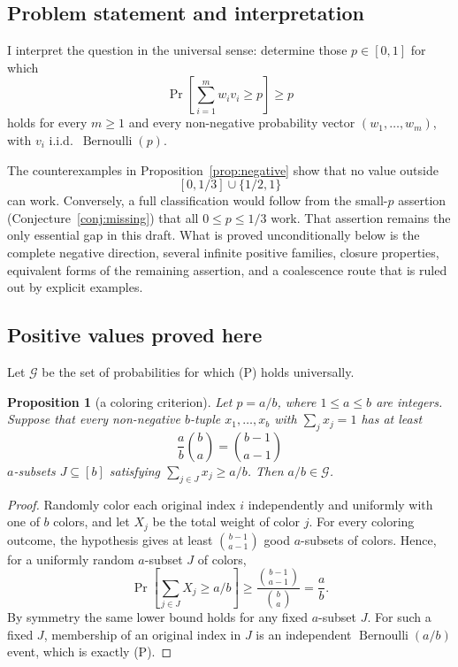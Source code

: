 \documentclass[12pt]{article}
\newtheorem{proposition}{Proposition}
\newcommand{\Ber}{\operatorname{Bernoulli}}
\begin{document}
\date{}



\subsection*{Problem statement and interpretation}

I interpret the question in the universal sense: determine those \(p\in[0,1]\)
for which
\[
        \Pr\!\left[\sum_{i=1}^m w_i v_i\ge p\right]\ge p                  \tag{P}
\]
holds for every \(m\ge1\) and every non-negative probability vector
\((w_1,\ldots,w_m)\), with \(v_i\) i.i.d.\ \(\Ber(p)\).

The counterexamples in Proposition~\ref{prop:negative} show that no value
outside
\[
        [0,1/3]\cup\{1/2,1\}
\]
can work.  Conversely, a full classification would follow from the
small-\(p\) assertion (Conjecture~\ref{conj:missing}) that all
\(0\le p\le1/3\) work.  That assertion remains the only essential gap in this
draft.  What is proved unconditionally below is the complete negative direction,
several infinite positive families, closure properties, equivalent forms of the
remaining assertion, and a coalescence route that is ruled out by explicit
examples.

\subsection*{Positive values proved here}

Let \(\mathcal G\) be the set of probabilities for which (P) holds universally.

\begin{proposition}[a coloring criterion]\label{prop:criterion}
Let \(p=a/b\), where \(1\le a\le b\) are integers.  Suppose that every
non-negative \(b\)-tuple \(x_1,\ldots,x_b\) with \(\sum_j x_j=1\) has at least
\[
        \frac{a}{b}\binom ba=\binom{b-1}{a-1}
\]
\(a\)-subsets \(J\subseteq[b]\) satisfying \(\sum_{j\in J}x_j\ge a/b\).  Then
\(a/b\in\mathcal G\).
\end{proposition}

\begin{proof}
Randomly color each original index \(i\) independently and uniformly with one
of \(b\) colors, and let \(X_j\) be the total weight of color \(j\).  For every
coloring outcome, the hypothesis gives at least \(\binom{b-1}{a-1}\) good
\(a\)-subsets of colors.  Hence, for a uniformly random \(a\)-subset \(J\) of
colors,
\[
       \Pr\!\left[\sum_{j\in J}X_j\ge a/b\right]\ge
       \frac{\binom{b-1}{a-1}}{\binom ba}=\frac ab .
\]
By symmetry the same lower bound holds for any fixed \(a\)-subset \(J\).  For
such a fixed \(J\), membership of an original index in \(J\) is an independent
\(\Ber(a/b)\) event, which is exactly (P).
\end{proof}
\end{document}
